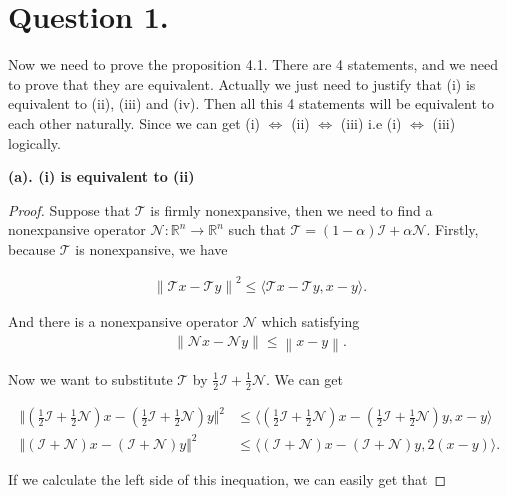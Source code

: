 \documentclass{report}
\begin{document}
\section*{Question 1.}
\par Now we need to prove the proposition 4.1. 
There are 4 statements, and we need to prove that they are equivalent. 
Actually we just need to justify that (i) is equivalent to (ii), (iii) and (iv). 
Then all this 4 statements will be equivalent to each other naturally. 
Since we can get (i) $\Leftrightarrow$ (ii) $\Leftrightarrow$ (iii)  i.e (i) $\Leftrightarrow$ (iii) logically. 
\vspace{0.5em}

\par {\bf (a). (i) is equivalent to (ii)}
\begin{proof}
Suppose that $\mathcal{T}$ is firmly nonexpansive, then we need to find a nonexpansive operator $ \mathcal{N} : \mathbb{R}^n \to \mathbb{R}^n$ 
such that $\mathcal{T}=(1-\alpha)\mathcal{I}+\alpha \mathcal{N}$. 
Firstly, because $\mathcal{T}$ is nonexpansive, we have 

\begin{align*}
    \left\lVert \mathcal{T}x-\mathcal{T}y\right\rVert ^2 \leq \langle \mathcal{T}x-\mathcal{T}y,x-y\rangle. 
\end{align*}

\par And there is a nonexpansive operator $\mathcal{N}$ which satisfying
\begin{align*}
    \left\lVert \mathcal{N}x-\mathcal{N}y\right\rVert \leq \left\lVert x-y\right\rVert.
\end{align*}

\par Now we want to substitute $\mathcal{T}$ by $\frac{1}{2}\mathcal{I}+\frac{1}{2}\mathcal{N}$.
We can get 

\begin{align*}
    \Vert (\frac{1}{2}\mathcal{I}+\frac{1}{2}\mathcal{N})x-(\frac{1}{2}\mathcal{I}+\frac{1}{2}\mathcal{N})y\Vert ^2&\leq \langle (\frac{1}{2}\mathcal{I}+\frac{1}{2}\mathcal{N})x-(\frac{1}{2}\mathcal{I}+\frac{1}{2}\mathcal{N})y,x-y\rangle \\
    \Vert (\mathcal{I}+\mathcal{N})x-(\mathcal{I}+\mathcal{N})y\Vert ^2&\leq \langle (\mathcal{I}+\mathcal{N})x-(\mathcal{I}+\mathcal{N})y,2(x-y)\rangle.
\end{align*}

\par If we calculate the left side of this inequation, we can easily get that 


\end{proof}
\end{document}
